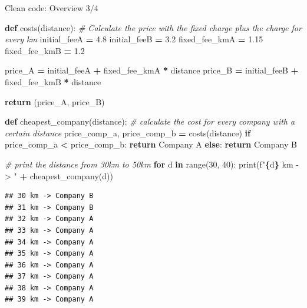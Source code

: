 \documentclass[
  8pt,
  ignorenonframetext,
]{beamer}
\newenvironment{Shaded}{\begin{snugshade}}{\end{snugshade}}
\newcommand{\BuiltInTok}[1]{#1}
\newcommand{\CommentTok}[1]{\textcolor[rgb]{0.56,0.35,0.01}{\textit{#1}}}
\newcommand{\ControlFlowTok}[1]{\textcolor[rgb]{0.13,0.29,0.53}{\textbf{#1}}}
\newcommand{\DecValTok}[1]{\textcolor[rgb]{0.00,0.00,0.81}{#1}}
\newcommand{\FloatTok}[1]{\textcolor[rgb]{0.00,0.00,0.81}{#1}}
\newcommand{\KeywordTok}[1]{\textcolor[rgb]{0.13,0.29,0.53}{\textbf{#1}}}
\newcommand{\NormalTok}[1]{#1}
\newcommand{\OperatorTok}[1]{\textcolor[rgb]{0.81,0.36,0.00}{\textbf{#1}}}
\newcommand{\SpecialCharTok}[1]{\textcolor[rgb]{0.81,0.36,0.00}{\textbf{#1}}}
\newcommand{\SpecialStringTok}[1]{\textcolor[rgb]{0.31,0.60,0.02}{#1}}
\newcommand{\StringTok}[1]{\textcolor[rgb]{0.31,0.60,0.02}{#1}}
\begin{document}
\begin{frame}[fragile]{Clean code: Overview 3/4}
\protect\hypertarget{clean-code-overview-34}{}
\begin{Shaded}
\begin{Highlighting}[]
\KeywordTok{def}\NormalTok{ costs(distance):}
    \CommentTok{\# Calculate the price with the fixed charge plus the charge for every km}
\NormalTok{    initial\_feeA }\OperatorTok{=} \FloatTok{4.8}
\NormalTok{    initial\_feeB }\OperatorTok{=} \FloatTok{3.2}
\NormalTok{    fixed\_fee\_kmA }\OperatorTok{=} \FloatTok{1.15}
\NormalTok{    fixed\_fee\_kmB }\OperatorTok{=} \FloatTok{1.2}
    
\NormalTok{    price\_A }\OperatorTok{=}\NormalTok{ initial\_feeA }\OperatorTok{+}\NormalTok{ fixed\_fee\_kmA }\OperatorTok{*}\NormalTok{ distance}
\NormalTok{    price\_B }\OperatorTok{=}\NormalTok{ initial\_feeB }\OperatorTok{+}\NormalTok{ fixed\_fee\_kmB }\OperatorTok{*}\NormalTok{ distance}
    
    \ControlFlowTok{return}\NormalTok{ (price\_A, price\_B)}

\KeywordTok{def}\NormalTok{ cheapest\_company(distance):}
    \CommentTok{\# calculate the cost for every company with a certain distance}
\NormalTok{    price\_comp\_a, price\_comp\_b }\OperatorTok{=}\NormalTok{ costs(distance)}
    \ControlFlowTok{if}\NormalTok{ price\_comp\_a }\OperatorTok{\textless{}}\NormalTok{ price\_comp\_b:}
        \ControlFlowTok{return} \StringTok{\textquotesingle{}Company A\textquotesingle{}}
    \ControlFlowTok{else}\NormalTok{:}
        \ControlFlowTok{return} \StringTok{\textquotesingle{}Company B\textquotesingle{}}

\CommentTok{\# print the distance from 30km to 50km}
\ControlFlowTok{for}\NormalTok{ d }\KeywordTok{in} \BuiltInTok{range}\NormalTok{(}\DecValTok{30}\NormalTok{, }\DecValTok{40}\NormalTok{):}
    \BuiltInTok{print}\NormalTok{(}\SpecialStringTok{f"}\SpecialCharTok{\{}\NormalTok{d}\SpecialCharTok{\}}\SpecialStringTok{ km {-}\textgreater{} "} \OperatorTok{+}\NormalTok{ cheapest\_company(d))}
\end{Highlighting}
\end{Shaded}

\begin{verbatim}
## 30 km -> Company B
## 31 km -> Company B
## 32 km -> Company A
## 33 km -> Company A
## 34 km -> Company A
## 35 km -> Company A
## 36 km -> Company A
## 37 km -> Company A
## 38 km -> Company A
## 39 km -> Company A
\end{verbatim}
\end{frame}
\end{document}
